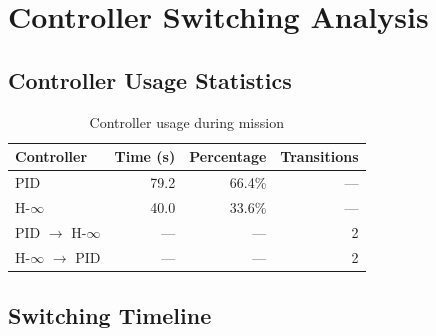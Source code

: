 \section{Controller Switching Analysis}

\subsection{Controller Usage Statistics}

\begin{table}[htbp]
    \centering
    \caption{Controller usage during mission}
    \label{tab:controller_usage}
    \begin{tabular}{@{}lrrr@{}}
        \toprule
        \textbf{Controller} & \textbf{Time (s)} & \textbf{Percentage} & \textbf{Transitions} \\
        \midrule
        PID & 79.2 & 66.4\% & --- \\
        H-$\infty$ & 40.0 & 33.6\% & --- \\
        \midrule
        PID $\rightarrow$ H-$\infty$ & --- & --- & 2 \\
        H-$\infty$ $\rightarrow$ PID & --- & --- & 2 \\
        \bottomrule
    \end{tabular}
\end{table}

\subsection{Switching Timeline}

